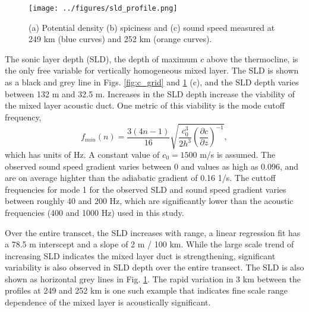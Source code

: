 \documentclass[preprint,NumberedRefs]{JASA}
\begin{document}
\begin{figure}
\texttt{[image: ../figures/sld\_profile.png]}
    \caption{\label{fig:profiles}{(a) Potential density (b) spiciness and (c) sound speed measured at 249 km (blue curves) and 252 km (orange curves).}}
\end{figure}

The sonic layer depth (SLD), the depth of maximum $c$ above the thermocline, is the only free variable for vertically homogeneous mixed layer. The SLD is shown as a black and grey line in Figs. \ref{fig:c_grid} and \ref{fig:profiles} (c), and the SLD depth varies between 132 m and 32.5 m. Increases in the SLD depth increase the viability of the mixed layer acoustic duct. One metric of this viability is the mode cutoff frequency,
\begin{equation}
    f_{min}(n) = \frac{3(4n-1)}{16} \sqrt{\frac{c_0^3}{2h^3} \left( \frac{\partial c}{\partial z} \right) ^ {-1}},
    \label{eq:f_cutoff}
\end{equation}
which has units of Hz. A constant value of $c_0 = 1500$ m/s is assumed. The observed sound speed gradient varies between 0 and values as high as 0.096, and are on average highter than the adiabatic gradient of 0.16 1/s\cite{colosi2020observations}. The cuttoff frequencies for mode 1 for the observed SLD and sound speed gradient varies between roughly 40 and 200 Hz, which are significantly lower than the acoustic frequencies (400 and 1000 Hz) used in this study.

Over the entire transcet, the SLD increases with range, a linear regression fit has a 78.5 m interscept and a slope of 2 m / 100 km. While the large scale trend of increasing SLD indicates the mixed layer duct is strengthening, significant variability is also observed in SLD depth over the entire transect. The SLD is also shown as horizontal grey lines in Fig. \ref{fig:profiles}. The rapid variation in 3 km between the profiles at 249 and 252 km is one such example that indicates fine scale range dependence of the mixed layer is acoustically significant.
\end{document}
